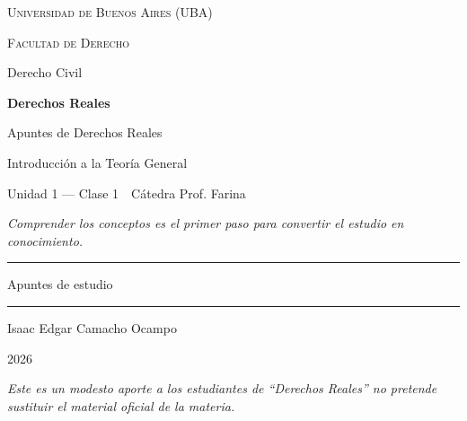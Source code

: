\documentclass[12pt,oneside]{book}
\newcommand{\universidad}{Universidad de Buenos Aires (UBA)}
\newcommand{\facultad}{Facultad de Derecho}
\newcommand{\carrera}{Derecho Civil}
\newcommand{\materia}{Derechos Reales}
\newcommand{\titulo}{Apuntes de Derechos Reales}
\newcommand{\subtitulo}{Introducci\'on a la Teor\'ia General}
\newcommand{\unidadclase}{Unidad 1 --- Clase 1}
\newcommand{\catedra}{C\'atedra Prof. Farina}
\newcommand{\autor}{Isaac Edgar Camacho Ocampo}
\newcommand{\anio}{2026}
\begin{document}
\begin{titlepage}

\thispagestyle{empty}

\begin{center}

\vspace*{1cm}

{\large \textsc{\universidad}}

\vspace{0.2cm}

{\large \textsc{\facultad}}

\vspace{0.2cm}

{\large \carrera}

\vspace{3cm}

{\Huge \textbf{\materia}}

\vspace{1cm}

{\LARGE \titulo}

\vspace{0.3cm}

{\large \subtitulo}

\vspace{0.2cm}

{\normalsize \unidadclase\ \textperiodcentered\ \catedra}

\vspace{0.8cm}

\textit{Comprender los conceptos es el primer paso para convertir el estudio en conocimiento.}

\vspace{1.2cm}

\rule{0.70\textwidth}{0.5pt}

\vspace{0.5cm}

{\large Apuntes de estudio}

\vspace{0.5cm}

\rule{0.70\textwidth}{0.5pt}

\vfill

{\large \autor}

\vspace{0.3cm}

{\large \anio}

\end{center}

\vfill

\begin{flushleft}
\textit{Este es un modesto aporte a los estudiantes de ``Derechos Reales'' no pretende sustituir el material oficial de la materia.}
\end{flushleft}

\end{titlepage}
\end{document}
